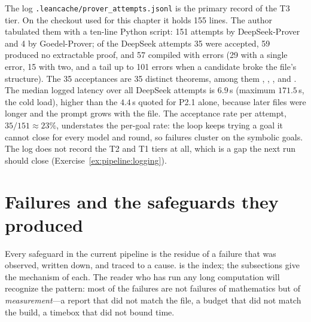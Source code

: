 \begin{example}\label{ex:pipeline:log}
The log \texttt{.leancache/prover\_attempts.jsonl} is the primary record of the
T3 tier. On the checkout used for this chapter it holds 155 lines. The author tabulated
them with a ten-line Python script: 151 attempts by DeepSeek-Prover and 4 by
Goedel-Prover; of the DeepSeek attempts 35 were accepted, 59 produced no extractable
proof, and 57 compiled with errors (29 with a single error, 15 with two, and a tail up to
101 errors when a candidate broke the file's structure). The 35 acceptances are 35
distinct theorems, among them , ,
,  and .
The median logged latency over all DeepSeek attempts is
$6.9$\,s (maximum $171.5$\,s, the cold load), higher than the $4.4$\,s quoted for P2.1
alone, because later files were longer and the prompt grows with the file. The acceptance
rate per attempt, $35/151\approx23\%$, understates the per-goal rate: the loop keeps trying
a goal it cannot close for every model and round, so failures cluster on the symbolic goals.
The log does not record the T2 and T1 tiers at all, which is a gap the next run should
close (Exercise~\ref{ex:pipeline:logging}).
\end{example}

\section{Failures and the safeguards they produced}\label{sec:pipeline:failures}

Every safeguard in the current pipeline is the residue of a failure that was observed,
written down, and traced to a cause.  is the index; the
subsections give the mechanism of each. The reader who has run any long computation will
recognize the pattern: most of the failures are not failures of mathematics but of
\emph{measurement}---a report that did not match the file, a budget that did not match
the build, a timebox that did not bound time.

